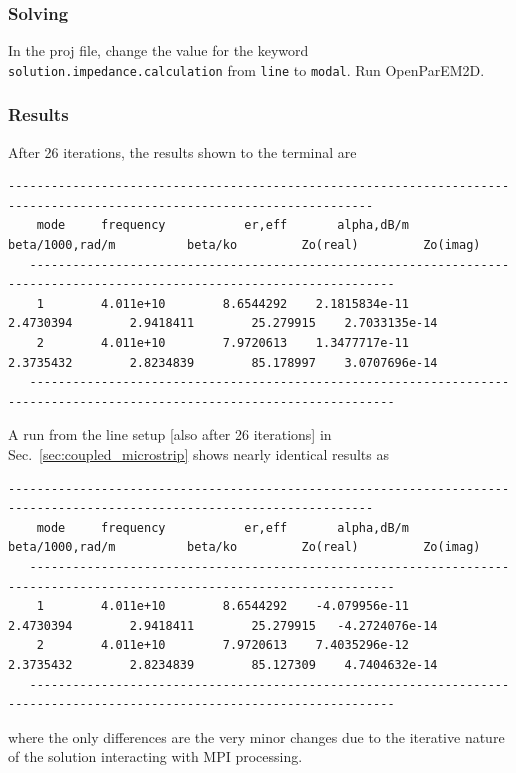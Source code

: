 \documentclass[titlepage]{article}
\renewcommand\_{\textunderscore\linebreak[1]}
\begin{document}
\subsubsection{Solving}

In the proj file, change the value for the keyword \texttt{solution.impedance.calculation} from \texttt{line} to \texttt{modal}.  Run OpenParEM2D.

\subsubsection{Results}

After 26 iterations, the results shown to the terminal are
\begin{Verbatim}[fontsize=\scriptsize]
   -------------------------------------------------------------------------------------------------------------------------
    mode     frequency           er,eff       alpha,dB/m  beta/1000,rad/m          beta/ko         Zo(real)         Zo(imag)
   -------------------------------------------------------------------------------------------------------------------------
    1        4.011e+10        8.6544292    2.1815834e-11        2.4730394        2.9418411        25.279915    2.7033135e-14
    2        4.011e+10        7.9720613    1.3477717e-11        2.3735432        2.8234839        85.178997    3.0707696e-14
   -------------------------------------------------------------------------------------------------------------------------
\end{Verbatim}
\noindent A run from the line setup [also after 26 iterations] in Sec.~\ref{sec:coupled_microstrip} shows nearly identical results as
\begin{Verbatim}[fontsize=\scriptsize]
   -------------------------------------------------------------------------------------------------------------------------
    mode     frequency           er,eff       alpha,dB/m  beta/1000,rad/m          beta/ko         Zo(real)         Zo(imag)
   -------------------------------------------------------------------------------------------------------------------------
    1        4.011e+10        8.6544292    -4.079956e-11        2.4730394        2.9418411        25.279915   -4.2724076e-14
    2        4.011e+10        7.9720613    7.4035296e-12        2.3735432        2.8234839        85.127309    4.7404632e-14
   -------------------------------------------------------------------------------------------------------------------------
\end{Verbatim}
\noindent where the only differences are the very minor changes due to the iterative nature of the solution interacting with MPI processing.
\end{document}
